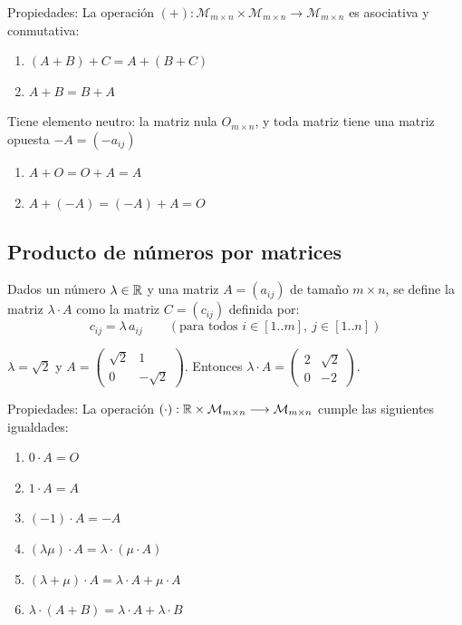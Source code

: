 \documentclass[11pt,a4paper]{article}
\newcommand{\M}{\mathcal{M}}
\begin{document}
Propiedades: La operación $(+):\M_{m\times n}\times\M_{m\times n}\longrightarrow\M_{m\times n}$ es asociativa y conmutativa:
\begin{enumerate}[label=(\arabic*)]
  \item $(A+B)+C=A+(B+C)$
  \item $A+B=B+A$
\end{enumerate}
Tiene elemento neutro: la matriz nula $O_{m\times n}$, y toda matriz tiene una matriz opuesta $-A=(-a_{ij})$
\begin{enumerate}[label=(\arabic*),start=3]
  \item $A+O=O+A=A$
  \item $A+(-A)=(-A)+A=O$
\end{enumerate}

\subsection{Producto de números por matrices}

\begin{definicion}
Dados un número $\lambda\in\mathbb{R}$ y una matriz $A=(a_{ij})$ de tamaño $m\times n$, se define la matriz $\lambda\cdot A$ como la matriz $C=(c_{ij})$ definida por:
\[
c_{ij}=\lambda\,a_{ij}\qquad(\text{para todos } i\in[1..m],\ j\in[1..n])
\]
\end{definicion}

\begin{ejemplo}
$\lambda=\sqrt2$ y $A=\begin{pmatrix}\sqrt2&1\\0&-\sqrt2\end{pmatrix}$.
Entonces $\lambda\cdot A=\begin{pmatrix}2&\sqrt2\\0&-2\end{pmatrix}$.
\end{ejemplo}

Propiedades: La operación $(\cdot):\R\times\M_{m\times n}\longrightarrow\M_{m\times n}$ cumple las siguientes igualdades:
\begin{enumerate}[label=(\arabic*)]
  \item $0\cdot A=O$
  \item $1\cdot A=A$
  \item $(-1)\cdot A=-A$
  \item $(\lambda\mu)\cdot A=\lambda\cdot(\mu\cdot A)$
  \item $(\lambda+\mu)\cdot A=\lambda\cdot A+\mu\cdot A$
  \item $\lambda\cdot(A+B)=\lambda\cdot A+\lambda\cdot B$
\end{enumerate}
\end{document}
